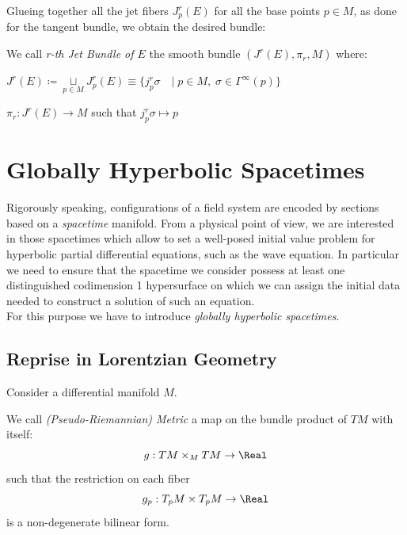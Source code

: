 \documentclass[Main]{subfiles}
\begin{document}
		Glueing together all the jet fibers $J^r_p (E)$ for all the base points $p\in M$, as done for the tangent bundle,  we obtain the desired bundle:
		\begin{definition}
			We call \emph{r-th Jet Bundle of $E$} the smooth bundle $(J^r(E), \pi_r, M)$	where:
			\begin{compactitemize}
				\item $J^r(E) \coloneqq \underset{p \in M}{\sqcup} J^r_p (E)
					 \equiv \big\{j^r_p\sigma \quad \vert \; p\in M, \; \sigma \in \Gamma^\infty(p) \big\}$
				\item $\pi_r: J^r(E) \rightarrow M$ such that $j^{r}_{p}\sigma \mapsto p $
			\end{compactitemize}
		\end{definition}

	\section{Globally Hyperbolic Spacetimes}
		Rigorously speaking, configurations of a field system are encoded by sections based on a \emph{spacetime} manifold.
		From a physical point of view, we are interested in those spacetimes which allow to set a well-posed initial value problem for hyperbolic partial differential equations, such as the wave equation.
		 In particular we need to ensure that the spacetime we consider possess at least one distinguished codimension 1 hypersurface on which we can assign the initial data needed to construct a solution of such an equation.
	 	\\
	 	For this purpose we have to  introduce \emph{globally hyperbolic spacetimes}.

		\subsection{Reprise in Lorentzian Geometry}
			Consider a differential manifold $M$.
			
			\begin{definition}
				We call \emph{(Pseudo-Riemannian) Metric} a map on the bundle product of $TM$ with itself: 
				$$g: TM \times_M TM \rightarrow \Real$$ 
				such that the restriction on each fiber $$g_p: T_pM \times T_pM \rightarrow \Real $$ is a non-degenerate bilinear form.
			\end{definition}
			
\end{document}
